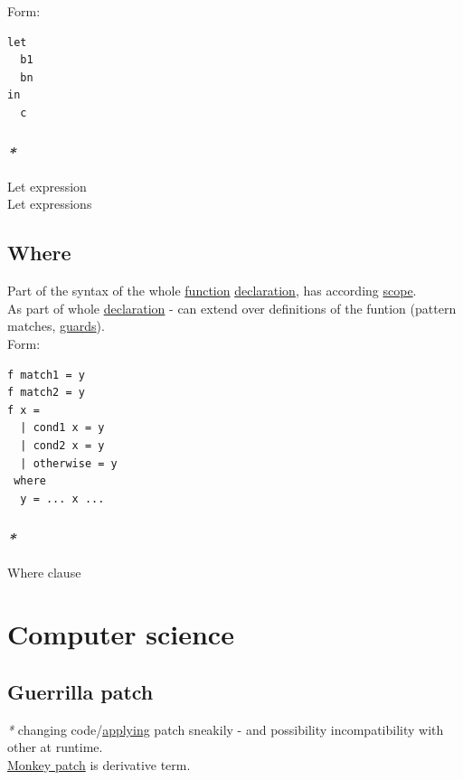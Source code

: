 \documentclass[a4paper,14pt,oneside]{book}
\begin{document}
Form:\\
\begin{verbatim}
let
  b1
  bn
in
  c
\end{verbatim}

\subsection{\emph{*}}
\label{sec:orgf61733a}

\label{orgeef85ee}Let expression\\
\label{org2d95a6f}Let expressions\\

\section{\label{orgd3dc8e4}Where}
\label{sec:orgbe390df}
Part of the syntax of the whole \hyperref[org8cc2ae4]{function} \hyperref[org9487164]{declaration}, has according \hyperref[orgb5173ee]{scope}.\\

As part of whole \hyperref[org9487164]{declaration} - can extend over definitions of the funtion (pattern matches, \hyperref[org5dbfb5b]{guards}).\\

Form:\\
\begin{verbatim}
f match1 = y
f match2 = y
f x =
  | cond1 x = y
  | cond2 x = y
  | otherwise = y
 where
  y = ... x ...
\end{verbatim}

\subsection{\emph{*}}
\label{sec:orgfdf2928}

\label{orgc539f25}Where clause\\

\chapter{Computer science}
\label{sec:org85506f5}
\section{\label{org746c158}Guerrilla patch}
\label{sec:org90cf828}
\emph{*} changing code/\hyperref[org950e91e]{applying} patch sneakily - and possibility incompatibility with other at runtime.\\
\hyperref[org7d93132]{Monkey patch} is derivative term.\\
\end{document}
